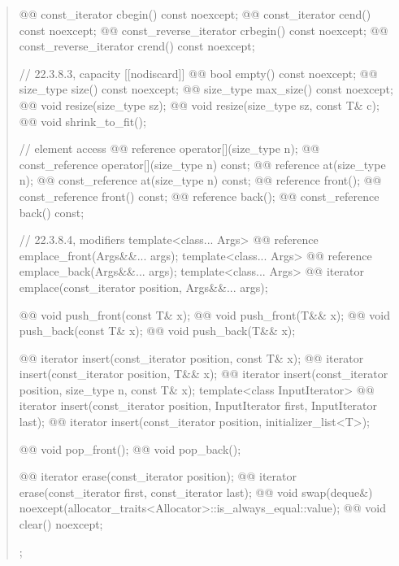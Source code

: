 \documentclass{wg21}
\begin{document}
\begin{quote}
\begin{codeblock}
{{    @@ const_iterator         cbegin() const noexcept;
    @@ const_iterator         cend() const noexcept;
    @@ const_reverse_iterator crbegin() const noexcept;
    @@ const_reverse_iterator crend() const noexcept;

    // 22.3.8.3, capacity
    [[nodiscard]] @@ bool empty() const noexcept;
    @@ size_type size() const noexcept;
    @@ size_type max_size() const noexcept;
    @@ void      resize(size_type sz);
    @@ void      resize(size_type sz, const T& c);
    @@ void      shrink_to_fit();

    // element access
    @@ reference       operator[](size_type n);
    @@ const_reference operator[](size_type n) const;
    @@ reference       at(size_type n);
    @@ const_reference at(size_type n) const;
    @@ reference       front();
    @@ const_reference front() const;
    @@ reference       back();
    @@ const_reference back() const;

    // 22.3.8.4, modifiers
    template<class... Args> @@ reference emplace_front(Args&&... args);
    template<class... Args> @@ reference emplace_back(Args&&... args);
    template<class... Args> @@ iterator emplace(const_iterator position, Args&&... args);
    
    @@ void push_front(const T& x);
    @@ void push_front(T&& x);
    @@ void push_back(const T& x);
    @@ void push_back(T&& x);
    
    @@ iterator insert(const_iterator position, const T& x);
    @@ iterator insert(const_iterator position, T&& x);
    @@ iterator insert(const_iterator position, size_type n, const T& x);
    template<class InputIterator>
      @@ iterator insert(const_iterator position, InputIterator first, InputIterator last);
    @@ iterator insert(const_iterator position, initializer_list<T>);
    
    @@ void pop_front();
    @@ void pop_back();
    
    @@ iterator erase(const_iterator position);
    @@ iterator erase(const_iterator first, const_iterator last);
    @@ void     swap(deque&)
      noexcept(allocator_traits<Allocator>::is_always_equal::value);
    @@ void     clear() noexcept;
  };

}
\end{codeblock}
\end{quote}
\end{document}
